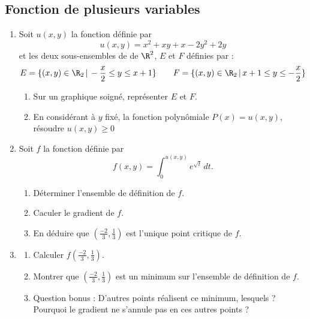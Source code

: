 \subsection{Fonction de plusieurs variables}

\begin{exercice}
\begin{enumerate}
\item Soit $u(x,y)$ la fonction définie par 
$$u(x,y) = x^2+xy +x-2y^2+2y$$
et  les deux sous-ensembles de de $\R^2$, $E$ et $F$ définies par : 
$$E = \{ (x,y) \in \R_2 \, | \,  -\frac{x}{2} \leq  y  \leq x+1\}\quad \quad F = \{ (x,y) \in \R_2 \, | \, x+1 \leq  y  \leq - \frac{x}{2}\}$$

\begin{enumerate}
\item Sur un graphique soigné,  représenter $E$ et $F$. 
\item En considérant à $y$  fixé, la fonction polynômiale $P(x) = u(x,y)$, résoudre $u(x,y)\geq 0$\\
\end{enumerate}
\item   Soit $f$ la fonction définie par  $$f(x,y) = \int_{0}^{u(x,y) }e^{\sqrt{t}}\,  dt.$$
\begin{enumerate}
\item Déterminer l'ensemble de définition de $f$. 
\item Caculer le gradient de $f$.
\item En déduire que $\left(\frac{-2}{3},\frac{1}{3}\right)$ est l'unique point critique de $f$. 
\end{enumerate}
\item 
\begin{enumerate}
\item Calculer $f\left(\frac{-2}{3},\frac{1}{3}\right)$.
\item Montrer que $\left(\frac{-2}{3},\frac{1}{3}\right)$ est un minimum sur l'ensemble de définition de $f$. 
\item Question bonus  : D'autres points réalisent ce minimum, lesquels ? Pourquoi le gradient ne s'annule pas en ces autres points ? 
\end{enumerate}
\end{enumerate}
\end{exercice}



